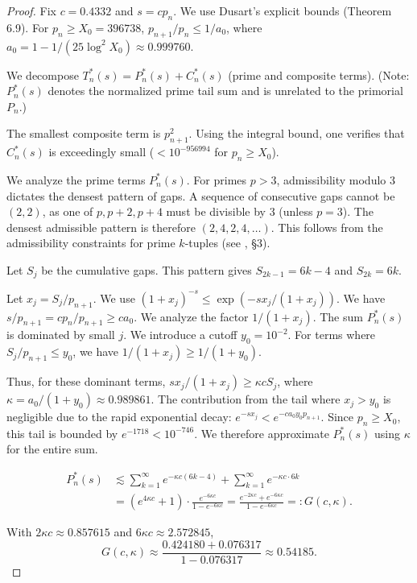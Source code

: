 \documentclass[12pt]{article}
\theoremstyle{plain}
\theoremstyle{definition}
\theoremstyle{remark}
\begin{document}
\begin{proof}
Fix $c = 0.4332$ and $s = cp_n$. We use Dusart's explicit bounds \cite{Dusart2010} (Theorem 6.9). For $p_n \geq X_0 = 396738$, $p_{n+1}/p_n \leq 1/a_0$, where $a_0 = 1 - 1/(25\log^2 X_0) \approx 0.999760$.

We decompose $T_n^*(s) = P_n^*(s) + C_n^*(s)$ (prime and composite terms). (Note: $P_n^*(s)$ denotes the normalized prime tail sum and is unrelated to the primorial $P_n$.)

The smallest composite term is $p_{n+1}^2$. Using the integral bound, one verifies that $C_n^*(s)$ is exceedingly small ($< 10^{-956994}$ for $p_n \geq X_0$).

We analyze the prime terms $P_n^*(s)$. For primes $p > 3$, admissibility modulo 3 dictates the densest pattern of gaps. A sequence of consecutive gaps cannot be $(2, 2)$, as one of $p, p+2, p+4$ must be divisible by 3 (unless $p=3$). The densest admissible pattern is therefore $(2, 4, 2, 4, \ldots)$. This follows from the admissibility constraints for prime $k$-tuples (see \cite{HardyLittlewood1923}, \S3).

Let $S_j$ be the cumulative gaps. This pattern gives $S_{2k-1} = 6k - 4$ and $S_{2k} = 6k$.

Let $x_j = S_j/p_{n+1}$. We use $(1 + x_j)^{-s} \leq \exp(-sx_j/(1+x_j))$.
We have $s/p_{n+1} = c p_n/p_{n+1} \geq c a_0$. We analyze the factor $1/(1+x_j)$. The sum $P_n^*(s)$ is dominated by small $j$. We introduce a cutoff $y_0 = 10^{-2}$. For terms where $S_j/p_{n+1} \leq y_0$, we have $1/(1+x_j) \geq 1/(1+y_0)$.

Thus, for these dominant terms, $s x_j/(1+x_j) \geq \kappa c S_j$, where $\kappa = a_0/(1+y_0) \approx 0.989861$. The contribution from the tail where $x_j > y_0$ is negligible due to the rapid exponential decay: $e^{-s x_j} < e^{-c a_0 y_0 p_{n+1}}$. Since $p_n \geq X_0$, this tail is bounded by $e^{-1718} < 10^{-746}$. We therefore approximate $P_n^*(s)$ using $\kappa$ for the entire sum.

\begin{align*}
P_n^*(s) &\lesssim \sum_{k=1}^{\infty} e^{-\kappa c(6k-4)} + \sum_{k=1}^{\infty} e^{-\kappa c \cdot 6k} \\
&= (e^{4\kappa c} + 1) \cdot \frac{e^{-6\kappa c}}{1 - e^{-6\kappa c}} = \frac{e^{-2\kappa c} + e^{-6\kappa c}}{1 - e^{-6\kappa c}} =: G(c, \kappa).
\end{align*}

With $2\kappa c \approx 0.857615$ and $6\kappa c \approx 2.572845$,
\[
G(c, \kappa) \approx \frac{0.424180 + 0.076317}{1 - 0.076317} \approx 0.54185.
\]


\end{proof}
\end{document}
